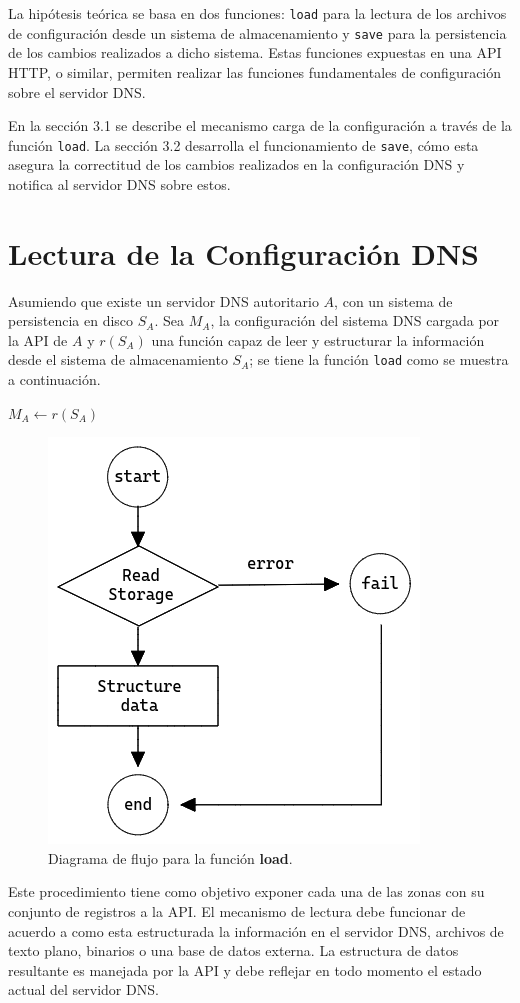 La hipótesis teórica se basa en dos funciones: \verb+load+ para la lectura de los archivos de configuración desde un sistema de almacenamiento y \verb+save+ para la persistencia de los cambios realizados a dicho sistema. Estas funciones expuestas en una API HTTP, o similar, permiten realizar las funciones fundamentales de configuración sobre el servidor DNS.

En la sección 3.1 se describe el mecanismo carga de la configuración a través de la función \verb|load|. La sección 3.2 desarrolla el funcionamiento de \verb|save|, cómo esta asegura la correctitud de los cambios realizados en la configuración DNS y notifica al servidor DNS sobre estos.

\section{Lectura de la Configuración DNS}

Asumiendo que existe un servidor DNS autoritario $A$, con un sistema de persistencia en disco $S_A$. Sea $M_A$, la configuración del sistema DNS cargada por la API de $A$ y $r(S_A)$ una función capaz de leer y estructurar la información desde el sistema de almacenamiento $S_A$; se tiene la función \verb+load+ como se muestra a continuación.

\begin{algorithmic}
    \State $M_A \leftarrow r(S_A)$
\EndProcedure
\end{algorithmic}

\begin{figure}[!ht]
    \centering
    \includegraphics[width=0.5\linewidth]{draws/load.png}
    \caption{Diagrama de flujo para la función \textbf{load}.}
\end{figure}

Este procedimiento tiene como objetivo exponer cada una de las zonas con su conjunto de registros a la API. El mecanismo de lectura debe funcionar de acuerdo a como esta estructurada la información en el servidor DNS, archivos de texto plano, binarios o una base de datos externa. La estructura de datos resultante es manejada por la API y debe reflejar en todo momento el estado actual del servidor DNS.

